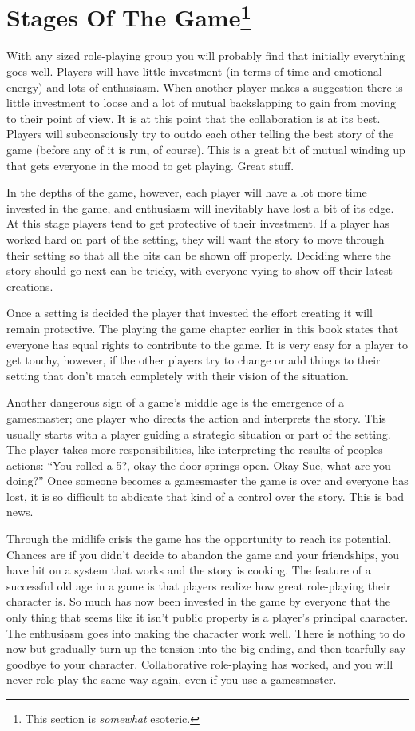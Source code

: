 \documentclass[twoside]{book}
\begin{document}
\section{Stages Of The Game\protect\footnote{This section is {\it somewhat} esoteric.}}

With any sized role-playing group you will probably find that
initially everything goes well. Players will have little investment
(in terms of time and emotional energy) and lots of enthusiasm. When
another player makes a suggestion there is little investment to loose
and a lot of mutual backslapping to gain from moving to their point of
view. It is at this point that the collaboration is at its
best. Players will subconsciously try to outdo each other telling the
best story of the game (before any of it is run, of course). This is a
great bit of mutual winding up that gets everyone in the mood to get
playing. Great stuff.

In the depths of the game, however, each player will have a lot more
time invested in the game, and enthusiasm will inevitably have lost a
bit of its edge. At this stage players tend to get protective of their
investment. If a player has worked hard on part of the setting, they
will want the story to move through their setting so that all the bits
can be shown off properly. Deciding where the story should go next can
be tricky, with everyone vying to show off their latest creations.

Once a setting is decided the player that invested the effort creating
it will remain protective. The playing the game chapter earlier in
this book states that everyone has equal rights to contribute to the
game. It is very easy for a player to get touchy, however, if the
other players try to change or add things to their setting that don't
match completely with their vision of the situation.

Another dangerous sign of a game's middle age is the emergence of a
gamesmaster; one player who directs the action and interprets the
story. This usually starts with a player guiding a strategic situation
or part of the setting. The player takes more responsibilities, like
interpreting the results of peoples actions: ``You rolled a 5?, okay
the door springs open. Okay Sue, what are you doing?'' Once someone
becomes a gamesmaster the game is over and everyone has lost, it is so
difficult to abdicate that kind of a control over the story. This is
bad news.

Through the midlife crisis the game has the opportunity to reach its
potential. Chances are if you didn't decide to abandon the game and
your friendships, you have hit on a system that works and the story is
cooking. The feature of a successful old age in a game is that players
realize how great role-playing their character is. So much has now
been invested in the game by everyone that the only thing that seems
like it isn't public property is a player's principal character. The
enthusiasm goes into making the character work well. There is nothing
to do now but gradually turn up the tension into the big ending, and
then tearfully say goodbye to your character. Collaborative
role-playing has worked, and you will never role-play the same way
again, even if you use a gamesmaster.
\end{document}
